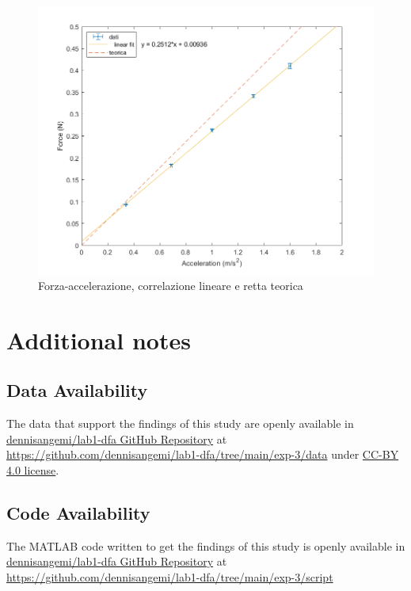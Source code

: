 \documentclass[11pt,a4paper]{article}
\begin{document}
\begin{figure}[H]
\includegraphics[scale=0.5]{plot-4.png}
\centering
\caption{Forza-accelerazione, correlazione lineare e retta teorica}
\label{plot:lincor}
\end{figure}

\section{Additional notes}

\subsection{Data Availability}
The data that support the findings of this study are openly available in \href{https://github.com/dennisangemi/lab1-dfa/tree/main/exp-3/data}{dennisangemi/lab1-dfa GitHub Repository} at \href{https://github.com/dennisangemi/lab1-dfa/tree/main/exp-3/data}{https://github.com/dennisangemi/lab1-dfa/tree/main/exp-3/data} under \href{https://creativecommons.org/licenses/by/4.0/}{CC-BY 4.0 license}.

\subsection{Code Availability}
The MATLAB code written to get the findings of this study is openly available in \href{https://github.com/dennisangemi/lab1-dfa/tree/main/exp-2/script}{dennisangemi/lab1-dfa GitHub Repository} at \href{https://github.com/dennisangemi/lab1-dfa/tree/main/exp-3/script}{https://github.com/dennisangemi/lab1-dfa/tree/main/exp-3/script}
\end{document}
